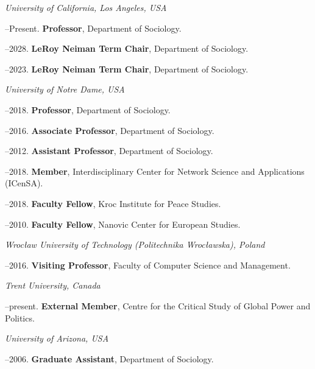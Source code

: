 \noindent\emph{University of California, Los Angeles, USA \vspace{0.01in}}

--Present. {\bf Professor}, Department of Sociology.

--2028. {\bf LeRoy Neiman Term Chair}, Department of Sociology. 

--2023. {\bf LeRoy Neiman Term Chair}, Department of Sociology. 
\medskip

\noindent\emph{University of Notre Dame, USA \vspace{0.01in}}

--2018. {\bf Professor}, Department of Sociology.

--2016. {\bf Associate Professor}, Department of Sociology.

--2012. {\bf Assistant Professor}, Department of Sociology.

--2018. {\bf Member}, Interdisciplinary Center for Network Science and Applications (ICenSA).

--2018. {\bf Faculty Fellow}, Kroc Institute for Peace Studies.

--2010. {\bf Faculty Fellow}, Nanovic Center for European Studies.

\medskip
\noindent\emph{Wroc\l{}aw University of Technology (Politechnika Wroc\l{}awska), Poland \vspace{0.01in}}

--2016. {\bf Visiting Professor}, Faculty of Computer Science and Management.

\medskip

\noindent\emph{Trent University, Canada \vspace{0.01in}}

--present.  {\bf External Member}, Centre for the Critical Study of Global Power and Politics.
\medskip

\noindent\emph{University of Arizona, USA \vspace{0.01in}}

--2006.  {\bf Graduate Assistant}, Department of Sociology.